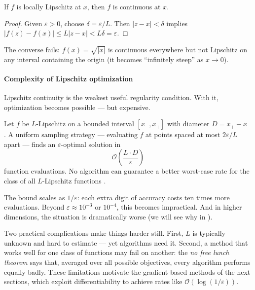 \begin{thm}\label{thm:lip-cont}
	If $f$ is locally Lipschitz at $x$, then $f$ is continuous at $x$.
\end{thm}
\begin{proof}
	Given $\varepsilon > 0$, choose $\delta = \varepsilon / L$.
	Then $|z - x| < \delta$ implies $|f(z) - f(x)| \leq L |z - x| < L \delta = \varepsilon$.
\end{proof}

The converse fails: $f(x) = \sqrt{|x|}$ is continuous everywhere but not Lipschitz on any interval containing the origin (it becomes ``infinitely steep'' as $x \to 0$).

\paragraph{Complexity of Lipschitz optimization}

Lipschitz continuity is the weakest useful regularity condition.
With it, optimization becomes possible --- but expensive.

\begin{thm}\label{thm:lip-complexity}
	Let $f$ be $L$-Lipschitz on a bounded interval $[x_-, x_+]$ with diameter $D = x_+ - x_-$.
	A uniform sampling strategy --- evaluating $f$ at points spaced at most $2\varepsilon/L$ apart --- finds an $\varepsilon$-optimal solution in
	\begin{equation}\label{eq:lipschitz-complexity}
		\mathcal{O}\!\left(\frac{L\cdot D}{\varepsilon}\right)
	\end{equation}
	function evaluations.
	No algorithm can guarantee a better worst-case rate for the class of all $L$-Lipschitz functions \cite{hansen1995}.
\end{thm}

The bound scales as $1/\varepsilon$: each extra digit of accuracy costs ten times more evaluations.
Beyond $\varepsilon \approx 10^{-3}$ or $10^{-4}$, this becomes impractical.
And in higher dimensions, the situation is dramatically worse (we will see why in ).

Two practical complications make things harder still.
First, $L$ is typically unknown and hard to estimate --- yet algorithms need it.
Second, a method that works well for one class of functions may fail on another: the \textit{no free lunch theorem} \cite{serafino2014} says that, averaged over all possible objectives, every algorithm performs equally badly.
These limitations motivate the gradient-based methods of the next sections, which exploit differentiability to achieve rates like $\mathcal{O}(\log(1/\varepsilon))$.


